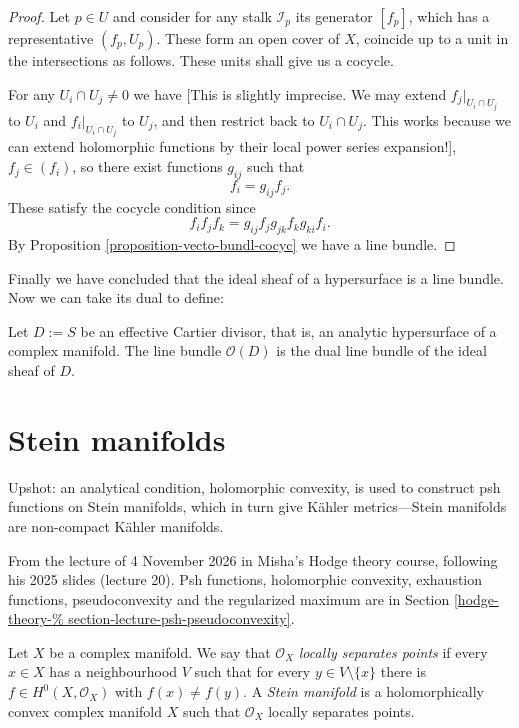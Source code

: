 \begin{proof}
Let $p \in U$ and consider for any stalk
$\mathcal{I}_p$
its generator $[f_p]$,
which has a representative $(f_p,U_p)$.
These form an open cover of $X$,
coincide up to a unit in the intersections as
follows.
These units shall give us a cocycle.

For any $U_i\cap U_j \neq 0$
we have
[This is slightly imprecise.
We may extend $f_j|_{U_i\cap U_j}$ to $U_i$
and $f_i|_{U_i\cap U_j}$ to $U_j$,
and then restrict back to $U_i\cap U_j$.
This works because we can extend holomorphic
functions by their local power series
expansion!],
$f_j\in (f_i)$, so there exist functions
$g_{ij}$ such that
$$
f_i=g_{ij}f_j.
$$
These satisfy the cocycle condition since
$$
f_if_jf_k=g_{ij}f_jg_{jk}f_kg_{ki}f_i.
$$
By Proposition
\ref{proposition-vecto-bundl-cocyc} we have a
line
bundle.
\end{proof}

\noindent
Finally we have concluded that the ideal
sheaf
of a hypersurface is a line bundle. Now we
can take its dual to define:

\begin{definition}
\label{definition-sheaf-assoc-effec-carti}
Let $D:=S$ be an effective Cartier divisor,
that is,
an analytic hypersurface of a complex
manifold.
The line bundle $\mathcal{O}(D)$ is the dual
line bundle
of the ideal sheaf of $D$.
\end{definition}

\section{Stein manifolds}
\label{section-stein-manifolds}

\noindent
Upshot: an analytical condition, holomorphic
convexity, is used to construct psh functions
on Stein manifolds, which in turn give Kähler
metrics—Stein manifolds are non-compact
Kähler manifolds.

\medskip\noindent
From the lecture of 4 November 2026 in
Misha's Hodge theory course, following his
2025 slides (lecture 20). Psh functions,
holomorphic convexity, exhaustion functions,
pseudoconvexity and the regularized maximum
are in Section
\ref{hodge-theory-%
section-lecture-psh-pseudoconvexity}.

\begin{definition}
\label{definition-stein-manifold}
Let $X$ be a complex manifold. We say that
$\mathcal{O}_X$ \textit{locally separates
points} if every $x\in X$ has a neighbourhood
$V$ such that for every $y\in
V\setminus\{x\}$ there is $f\in
H^0(X,\mathcal{O}_X)$ with $f(x)\neq f(y)$. A
\textit{Stein manifold} is a holomorphically
convex complex manifold $X$ such that
$\mathcal{O}_X$ locally separates points.
\end{definition}

